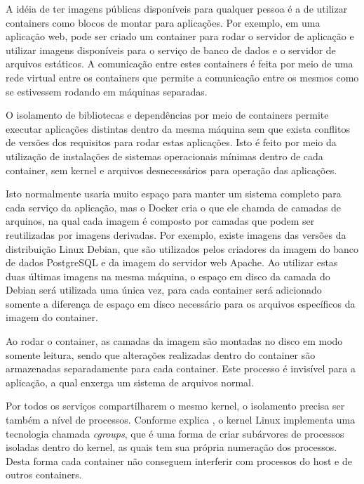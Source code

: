 A idéia de ter imagens públicas disponíveis para qualquer pessoa é a de
utilizar containers como blocos de montar para aplicações. Por exemplo,
em uma aplicação web, pode ser criado um container para rodar o servidor de
aplicação e utilizar imagens disponíveis para o serviço de banco de dados e
o servidor de arquivos estáticos. A comunicação entre estes containers é feita
por meio de uma rede virtual entre os containers que permite a comunicação
entre os mesmos como se estivessem rodando em máquinas separadas.

O isolamento de bibliotecas e dependências por meio de containers permite
executar aplicações distintas dentro da mesma máquina sem que exista
conflitos de versões dos requisitos para rodar estas aplicações. Isto é feito
por meio da utilização de instalações de sistemas operacionais mínimas dentro
de cada container, sem kernel e arquivos desnecessários para operação das
aplicações.

Isto normalmente usaria muito espaço para manter um sistema completo para
cada serviço da aplicação, mas o Docker cria o que ele chamda de camadas
de arquinos, na qual cada imagem é composto por camadas que podem ser
reutilizadas por imagens derivadas. Por exemplo, existe imagens das
versões da distribuição Linux Debian, que são utilizados pelos criadores da
imagem do banco de dados PostgreSQL e da imagem do servidor web Apache.
Ao utilizar estas duas últimas imagens na mesma máquina, o espaço em disco
da camada do Debian será utilizada uma única vez, para cada container será
adicionado somente a diferença de espaço em disco necessário para os arquivos
específicos da imagem do container.

Ao rodar o container, as camadas da imagem são montadas no disco em modo
somente leitura, sendo que alterações realizadas dentro do container são
armazenadas separadamente para cada container. Este processo é invisível para
a aplicação, a qual enxerga um sistema de arquivos normal.

Por todos os serviços compartilharem o mesmo kernel, o isolamento precisa
ser também a nível de processos. Conforme explica ,
o kernel Linux implementa uma tecnologia chamada \emph{cgroups}, que é uma
forma de criar subárvores de processos isoladas dentro do kernel, as quais
tem sua própria numeração dos processos. Desta forma cada container não
conseguem interferir com processos do host e de outros containers.

